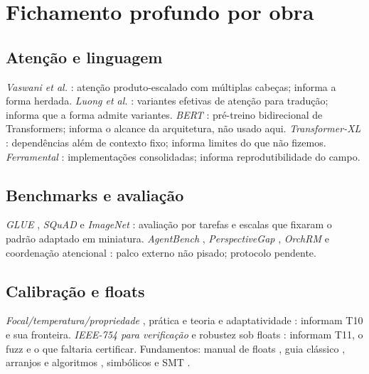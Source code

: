 \section{Fichamento profundo por obra}
\subsection{Atenção e linguagem}
\textit{Vaswani et al.} \cite{vaswani2017}: atenção produto-escalado com múltiplas cabeças; informa a forma herdada. \textit{Luong et al.} \cite{luong2015}: variantes efetivas de atenção para tradução; informa que a forma admite variantes. \textit{BERT} \cite{devlin2019}: pré-treino bidirecional de Transformers; informa o alcance da arquitetura, não usado aqui. \textit{Transformer-XL} \cite{dai2019}: dependências além de contexto fixo; informa limites do que não fizemos. \textit{Ferramental} \cite{wolf2020}: implementações consolidadas; informa reprodutibilidade do campo.
\subsection{Benchmarks e avaliação}
\textit{GLUE} \cite{wang2018}, \textit{SQuAD} \cite{rajpurkar2016} e \textit{ImageNet} \cite{deng2009}: avaliação por tarefas e escalas que fixaram o padrão adaptado em miniatura. \textit{AgentBench} \cite{agentbench2023}, \textit{PerspectiveGap} \cite{perspectivegap2026}, \textit{OrchRM} \cite{orchrm2026} e coordenação atencional \cite{orchestrator2025}: palco externo não pisado; protocolo pendente.
\subsection{Calibração e floats}
\textit{Focal/temperatura/propriedade} \cite{komisarenko2024}, prática e teoria \cite{xuan2025} e adaptatividade \cite{xie2024}: informam T10 e sua fronteira. \textit{IEEE-754 para verificação} \cite{bagnara2019} e robustez sob floats \cite{murray2026}: informam T11, o fuzz e o que faltaria certificar. Fundamentos: manual de floats \cite{muller2018}, guia clássico \cite{goldberg1991}, arranjos e algoritmos \cite{harris2020,virtanen2020}, simbólicos e SMT \cite{meurer2017,demoura2008}.
